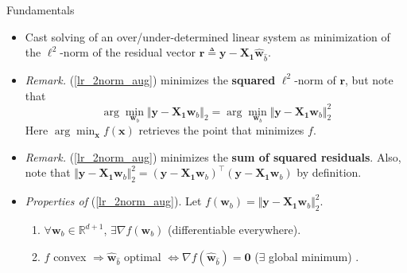 \documentclass{beamer}
\numberwithin{equation}{section}
\newcommand{\aref}[1]{\alert{\ref{#1}}}
\begin{document}
\begin{frame}{Fundamentals}
    \begin{itemize}
        \item
        Cast solving of an over/under-determined linear system as minimization
        of the $ \ell^2 $-norm of the residual vector $ \mathbf{r} \triangleq
        \mathbf{y} - \mathbf{X}_\mathbf{1}\hat{\mathbf{w}}_{\hat{b}} $.

        \item
        \textit{Remark.} (\aref{lr_2norm_aug}) minimizes the \textbf{squared}
        $ \ell^2 $-norm of $ \mathbf{r} $, but note that
        \begin{equation*}
            \arg\min_{\mathbf{w}_b}
            \Vert\mathbf{y} - \mathbf{X}_\mathbf{1}\mathbf{w}_b\Vert_2 =
            \arg\min_{\mathbf{w}_b}
            \Vert\mathbf{y} - \mathbf{X}_\mathbf{1}\mathbf{w}_b\Vert_2^2
        \end{equation*}
        Here $ \arg\min_\mathbf{x}f(\mathbf{x}) $ retrieves the point that
        minimizes $ f $.

        \item
        \textit{Remark.} (\aref{lr_2norm_aug}) minimizes the
        \textbf{sum of squared residuals}. Also, note that
        $ \Vert\mathbf{y} - \mathbf{X}_\mathbf{1}\mathbf{w}_b\Vert_2^2 =
        (\mathbf{y} - \mathbf{X}_\mathbf{1}\mathbf{w}_b)^\top(\mathbf{y} -
        \mathbf{X}_\mathbf{1}\mathbf{w}_b) $ by definition.

        \item
        \textit{Properties of }(\aref{lr_2norm_aug}). Let $ f(\mathbf{w}_b) =
        \Vert\mathbf{y} - \mathbf{X}_\mathbf{1}\mathbf{w}_b\Vert_2^2 $.
        \begin{enumerate}
            \item
            $ \forall \mathbf{w}_b \in \mathbb{R}^{d + 1} $,
            $ \exists \nabla f(\mathbf{w}_b) $ (differentiable everywhere).

            \item
            $ f $ convex $ \Rightarrow \hat{\mathbf{w}}_{\hat{b}} $ optimal
            $ \Leftrightarrow \nabla f(\hat{\mathbf{w}}_{\hat{b}}) =
            \mathbf{0} $ ($ \exists $ global minimum) \cite{bv_convex_opt}.
        \end{enumerate}
    \end{itemize}
\end{frame}
\end{document}
